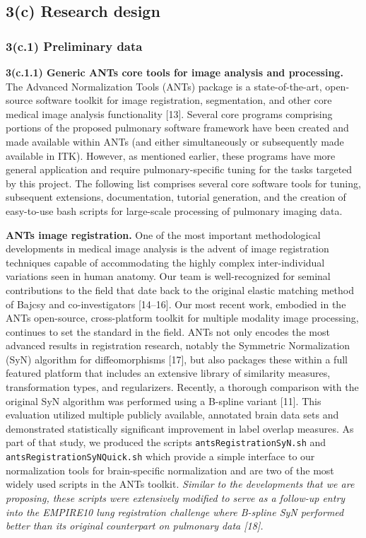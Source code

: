 \documentclass[11pt,]{article}
\begin{document}
\subsection{\textbf{3(c) Research design}}\label{c-research-design}

\subsubsection{3(c.1) Preliminary data}\label{c.1-preliminary-data}

\textbf{3(c.1.1) Generic ANTs core tools for image analysis and
processing.} The Advanced Normalization Tools (ANTs) package is a
state-of-the-art, open-source software toolkit for image registration,
segmentation, and other core medical image analysis functionality
{[}13{]}. Several core programs comprising portions of the proposed
pulmonary software framework have been created and made available within
ANTs (and either simultaneously or subsequently made available in ITK).
However, as mentioned earlier, these programs have more general
application and require pulmonary-specific tuning for the tasks targeted
by this project. The following list comprises several core software
tools for tuning, subsequent extensions, documentation, tutorial
generation, and the creation of easy-to-use bash scripts for large-scale
processing of pulmonary imaging data.

\textbf{ANTs image registration.} One of the most important
methodological developments in medical image analysis is the advent of
image registration techniques capable of accommodating the highly
complex inter-individual variations seen in human anatomy. Our team is
well-recognized for seminal contributions to the field that date back to
the original elastic matching method of Bajcsy and co-investigators
{[}14--16{]}. Our most recent work, embodied in the ANTs open-source,
cross-platform toolkit for multiple modality image processing, continues
to set the standard in the field. ANTs not only encodes the most
advanced results in registration research, notably the Symmetric
Normalization (SyN) algorithm for diffeomorphisms {[}17{]}, but also
packages these within a full featured platform that includes an
extensive library of similarity measures, transformation types, and
regularizers. Recently, a thorough comparison with the original SyN
algorithm was performed using a B-spline variant {[}11{]}. This
evaluation utilized multiple publicly available, annotated brain data
sets and demonstrated statistically significant improvement in label
overlap measures. As part of that study, we produced the scripts
\texttt{antsRegistrationSyN.sh} and \texttt{antsRegistrationSyNQuick.sh}
which provide a simple interface to our normalization tools for
brain-specific normalization and are two of the most widely used scripts
in the ANTs toolkit. \emph{Similar to the developments that we are
proposing, these scripts were extensively modified to serve as a
follow-up entry into the EMPIRE10 lung registration challenge where
B-spline SyN performed better than its original counterpart on pulmonary
data {[}18{]}.}
\end{document}
